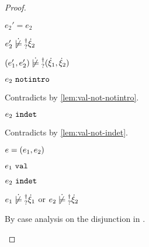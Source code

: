 \begin{proof}
\begin{byCases}
\begin{byCases}
\begin{byCases}
\begin{byCases}
\begin{byCases}
\begin{byCases}
              \item[\text{(\ref{rule:IVVal})}]
              \begin{pfsteps*}
              \item $e_2'=e_2$  
              \item $\cnotsatisfyormay{e_2'}{\hxi_2}$  
              \item $\cnotsatisfyormay{\hpair{e_1'}{e_2'}}{\cpair{\hxi_1}{\hxi_2}}$ 
              \end{pfsteps*} 
              \item[\text{(\ref{rule:IVIndet})}]
              \begin{pfsteps*}
              \item $e_2 ~\mathtt{notintro}$ 
              \end{pfsteps*} 
              Contradicts  by \autoref{lem:val-not-notintro}.
              \item[\text{(\ref{rule:IVInl}), (\ref{rule:IVInr}), (\ref{rule:IVPair})}]
              \begin{pfsteps*}
              \item $e_2 ~\mathtt{indet}$ 
              \end{pfsteps*} 
              Contradicts  by \autoref{lem:val-not-indet}.
            \end{byCases}
          \end{byCases}
        \end{byCases}
        \item[\text{(\ref{rule:IPairR})}] 
        \begin{pfsteps*}
        \item $e=(e_1 , e_2)$ 
        \item $e_1 ~\mathtt{val}$  
        \item $e_2 ~\mathtt{indet}$  
        \item $\cnotsatisfyormay{e_1}{\hxi_1}$ or $\cnotsatisfyormay{e_2}{\hxi_2}$  
        \end{pfsteps*}
        By case analysis on the disjunction in .

\end{byCases}
\end{byCases}
\end{byCases}
\end{proof}

